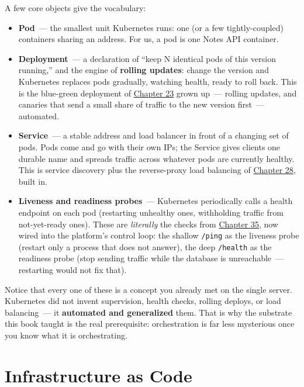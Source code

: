 A few core objects give the vocabulary:

\begin{itemize}
\tightlist
\item
  \textbf{Pod}~--- the smallest unit Kubernetes runs: one (or a few tightly-coupled) containers sharing an address. For us, a pod is one Notes API container.
\item
  \textbf{Deployment}~--- a declaration of ``keep N identical pods of this version running,'' and the engine of \textbf{rolling updates}: change the version and Kubernetes replaces pods gradually, watching health, ready to roll back. This is the blue-green deployment of \hyperref[ch:23-code-transfer]{Chapter 23} grown up~--- rolling updates, and canaries that send a small share of traffic to the new version first~--- automated.
\item
  \textbf{Service}~--- a stable address and load balancer in front of a changing set of pods. Pods come and go with their own IPs; the Service gives clients one durable name and spreads traffic across whatever pods are currently healthy. This is service discovery plus the reverse-proxy load balancing of \hyperref[ch:28-traffic-routing]{Chapter 28}, built in.
\item
  \textbf{Liveness and readiness probes}~--- Kubernetes periodically calls a health endpoint on each pod (restarting unhealthy ones, withholding traffic from not-yet-ready ones). These are \emph{literally} the checks from \hyperref[ch:35-observability]{Chapter 35}, now wired into the platform's control loop: the shallow \texttt{/ping} as the liveness probe (restart only a process that does not answer), the deep \texttt{/health} as the readiness probe (stop sending traffic while the database is unreachable~--- restarting would not fix that).
\end{itemize}

\noindent{}Notice that every one of these is a concept you already met on the single server. Kubernetes did not invent supervision, health checks, rolling deploys, or load balancing~--- it \textbf{automated and generalized} them. That is why the substrate this book taught is the real prerequisite: orchestration is far less mysterious once you know what it is orchestrating.

\setcounter{section}{2}
\section{Infrastructure as Code}\label{43-cloud-native-orchestration:433-infrastructure-as-code}

